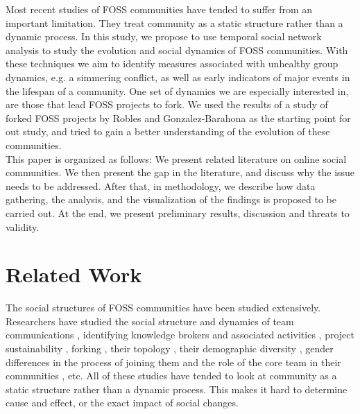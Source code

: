 \documentclass[conference]{IEEEtran}
\begin{document}
Most recent studies of FOSS communities have tended to suffer from an important limitation. They treat community as a static structure rather than a dynamic process. In this study, we propose to use temporal social network analysis to study the evolution and social dynamics of FOSS communities. With these techniques we aim to identify measures associated with unhealthy group dynamics, e.g. a simmering conflict, as well as early indicators of major events in the lifespan of a community. One set of dynamics we are especially interested in, are those that lead FOSS projects to fork. We used the results of a study of forked FOSS projects by Robles and Gonzalez-Barahona \cite{Robles} as the starting point for out study, and tried to gain a better understanding of the evolution of these communities.\\

This paper is organized as follows: We present related literature on online social communities. We then present the gap in the literature, and discuss why the issue needs to be addressed. After that, in methodology, we describe how data gathering, the analysis, and the visualization of the findings is proposed to be carried out. At the end, we present preliminary results, discussion and threats to validity.\\
\section{Related Work}
\label{relatedwork}
The social structures of FOSS communities have been studied extensively. Researchers have studied the social structure and dynamics of team communications \cite{Bird}\cite{HowisonSocialDynamics}\cite{HowisonFlossMole}, identifying knowledge brokers and associated activities \cite{Sowe}, project sustainability \cite{NymanForkingSustainability}, forking \cite{NymanCodeForking}, their topology \cite{Bird}, their demographic diversity \cite{Kunegis}, gender differences in the process of joining them \cite{Kuechler} and the role of the core team in their communities \cite{Torres}, etc. All of these studies have tended to look at community as a static structure rather than a dynamic process. This makes it hard to determine cause and effect, or the exact impact of social changes.\\
\end{document}
